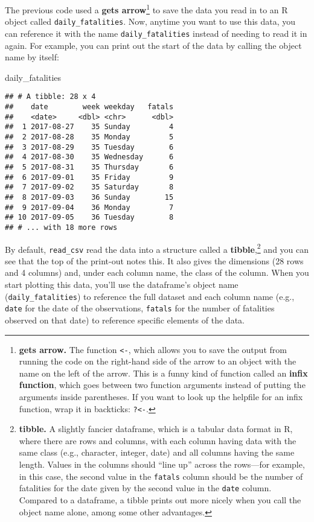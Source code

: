 \documentclass[]{tufte-book}
\newenvironment{Shaded}{}{}
\newcommand{\NormalTok}[1]{#1}
\begin{document}
The previous code used a \textbf{gets arrow}\footnote{\textbf{gets arrow.} The function
  \texttt{\textless{}-}, which allows you to save the output from running the code on the right-hand
  side of the arrow to an object with the name on the left of the arrow. This is a
  funny kind of function called an \textbf{infix function}, which goes between two
  function arguments instead of putting the arguments inside parentheses. If you
  want to look up the helpfile for an infix function, wrap it in backticks:
  \texttt{?\textasciigrave{}\textless{}-\textasciigrave{}}.} to save the data you read in to an R object called \texttt{daily\_fatalities}.
Now, anytime you want to use this data, you can reference it with the name
\texttt{daily\_fatalities} instead of needing to read it in again. For example, you
can print out the start of the data by calling the object name by itself:

\begin{Shaded}
\begin{Highlighting}[]
\NormalTok{daily_fatalities}
\end{Highlighting}
\end{Shaded}

\begin{verbatim}
## # A tibble: 28 x 4
##    date        week weekday   fatals
##    <date>     <dbl> <chr>      <dbl>
##  1 2017-08-27    35 Sunday         4
##  2 2017-08-28    35 Monday         5
##  3 2017-08-29    35 Tuesday        6
##  4 2017-08-30    35 Wednesday      6
##  5 2017-08-31    35 Thursday       6
##  6 2017-09-01    35 Friday         9
##  7 2017-09-02    35 Saturday       8
##  8 2017-09-03    36 Sunday        15
##  9 2017-09-04    36 Monday         7
## 10 2017-09-05    36 Tuesday        8
## # ... with 18 more rows
\end{verbatim}

By default, \texttt{read\_csv} read the data into a structure called a \textbf{tibble},\footnote{\textbf{tibble.}
  A slightly fancier dataframe, which is a tabular data format in R, where there are
  rows and columns, with each column having data with the same class (e.g., character,
  integer, date) and all columns having the same length. Values in the columns should
  ``line up'' across the rows---for example, in this case, the second value in the
  \texttt{fatals} column should be the number of fatalities for the date given by the second
  value in the \texttt{date} column. Compared to a dataframe, a tibble prints out more nicely
  when you call the object name alone, among some other advantages.} and you
can see that the top of the print-out notes this. It also gives the dimensions
(28 rows and 4 columns) and, under each column name, the class of the column.
When you start plotting this data, you'll use the dataframe's object name
(\texttt{daily\_fatalities}) to reference the full dataset and each column name
(e.g., \texttt{date} for the date of the observations, \texttt{fatals} for the number of
fatalities observed on that date) to reference specific elements of the data.
\end{document}
